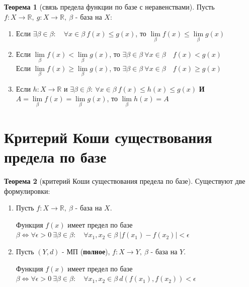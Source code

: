 \documentclass{report}
\theoremstyle{definition}
\newtheorem*{theorem}{Теорема}
\begin{document}
\begin{theorem}[связь предела функции по базе с неравенствами]
    Пусть $f:X\rightarrow\mathbb{R}, \ g:X\rightarrow\mathbb{R}, \ \beta$ - база на $X$:
    \begin{enumerate}
        \item Если $\exists\beta\in\beta: \quad \forall x \in \beta \ f(x) \leqslant g(x)$, то $\underset{\beta}
                  {\lim}f(x) \leqslant \underset{\beta}{\lim}g(x)$
        \item Если $\underset{\beta}{\lim}f(x) < \underset{\beta}{\lim}g(x)$, то $\exists\beta\in\beta \ \forall
                  x \in \beta \quad f(x) < g(x)$\\

              Если $\underset{\beta}{\lim}f(x) \geqslant \underset{\beta}{\lim}g(x)$, то $\exists\beta\in\beta \ \forall
                  x \in \beta \quad f(x) \geqslant g(x)$
        \item Если $h:X\rightarrow \mathbb{R}$ и $\exists\beta\in\beta: \ \forall x \in \beta \ f(x) \leqslant h(x)
                  \leqslant g(x)$ \textbf{И} $A = \underset{\beta}{\lim}f(x) = \underset{\beta}{\lim}g(x)$, то $\underset{\beta}
                  {\lim}h(x) = A$
    \end{enumerate}
\end{theorem}

\section{Критерий Коши существования предела по базе}

\begin{theorem}[критерий Коши существования предела по базе]
    Существуют две формулировки:
    \begin{enumerate}
        \item Пусть $f:X\rightarrow\mathbb{R}, \ \beta$ - база на $X$.

              Функция $f(x)$ имеет предел по базе $\beta \iff \forall \epsilon > 0 \ \exists\beta\in\beta: \quad \forall
                  x_{1},x_{2} \in \beta \ |f(x_{1}) - f(x_{2})| < \epsilon$

        \item Пусть $(Y,d)$ - МП (\textbf{полное}), $f:X\rightarrow Y, \ \beta$ - база на $Y$.

              Функция $f(x)$ имеет предел по базе $\beta \iff \forall \epsilon>0 \ \exists\beta\in\beta: \quad \forall
                  x_{1},x_{2} \in \beta \ d(f(x_{1}), f(x_{2})) < \epsilon$
    \end{enumerate}
\end{theorem}
\end{document}
